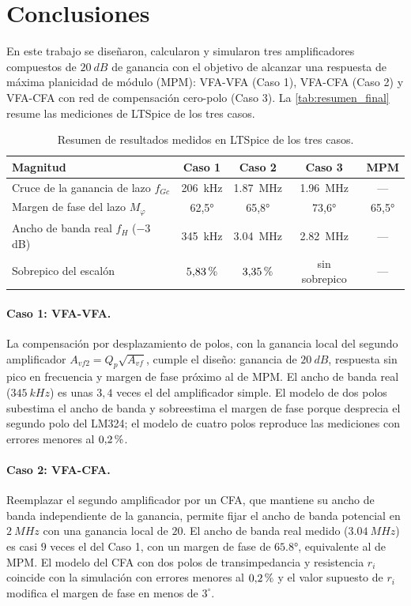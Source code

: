 \section{Conclusiones}
\label{sec:conclusiones}

En este trabajo se diseñaron, calcularon y simularon tres amplificadores compuestos de $\SI{20}{dB}$ de ganancia con el objetivo de alcanzar una respuesta de máxima planicidad de módulo (MPM): VFA-VFA (Caso 1), VFA-CFA (Caso 2) y VFA-CFA con red de compensación cero-polo (Caso 3). La \autoref{tab:resumen_final} resume las mediciones de LTSpice de los tres casos.

\begin{table}[H]
\centering
\caption{Resumen de resultados medidos en LTSpice de los tres casos.}
\label{tab:resumen_final}
\small
\setlength{\tabcolsep}{4pt}
\begin{tabular}{lcccc}
\toprule
\textbf{Magnitud} & \textbf{Caso 1} & \textbf{Caso 2} & \textbf{Caso 3} & \textbf{MPM} \\
\midrule
Cruce de la ganancia de lazo $f_{Gc}$ & \SI{206}{kHz} & \SI{1,87}{MHz} & \SI{1,96}{MHz} & --- \\
Margen de fase del lazo $M_\varphi$ & \ang{62,5} & \ang{65,8} & \ang{73,6} & \ang{65,5} \\
Ancho de banda real $f_H$ ($-3$ dB) & \SI{345}{kHz} & \SI{3,04}{MHz} & \SI{2,82}{MHz} & --- \\
Sobrepico del escalón & $5{,}83\,\mathrm{\char37}$ & $3{,}35\,\mathrm{\char37}$ & sin sobrepico & --- \\
\bottomrule
\end{tabular}
\end{table}

\paragraph{Caso 1: VFA-VFA.} La compensación por desplazamiento de polos, con la ganancia local del segundo amplificador $A_{vf2} = Q_p\sqrt{A_{vf}}$, cumple el diseño: ganancia de $\SI{20}{dB}$, respuesta sin pico en frecuencia y margen de fase próximo al de MPM. El ancho de banda real ($\SI{345}{kHz}$) es unas $3{,}4$ veces el del amplificador simple. El modelo de dos polos subestima el ancho de banda y sobreestima el margen de fase porque desprecia el segundo polo del LM324; el modelo de cuatro polos reproduce las mediciones con errores menores al $0{,}2\,\mathrm{\char37}$.

\paragraph{Caso 2: VFA-CFA.} Reemplazar el segundo amplificador por un CFA, que mantiene su ancho de banda independiente de la ganancia, permite fijar el ancho de banda potencial en $\SI{2}{MHz}$ con una ganancia local de $20$. El ancho de banda real medido ($\SI{3,04}{MHz}$) es casi $9$ veces el del Caso 1, con un margen de fase de $\ang{65,8}$, equivalente al de MPM. El modelo del CFA con dos polos de transimpedancia y resistencia $r_i$ coincide con la simulación con errores menores al $0{,}2\,\mathrm{\char37}$ y el valor supuesto de $r_i$ modifica el margen de fase en menos de $3^\circ$.

